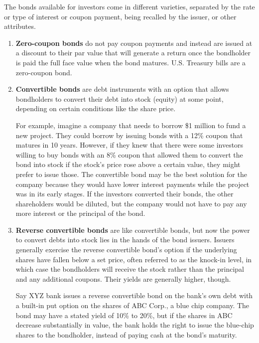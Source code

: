 \documentclass{article}
\begin{document}
    \begin{definition}
      The bonds available for investors come in different varieties, separated by the rate or type of interest or coupon payment, being recalled by the issuer, or other attributes. 
      \begin{enumerate}
        \item \textbf{Zero-coupon bonds} do not pay coupon payments and instead are issued at a discount to their par value that will generate a return once the bondholder is paid the full face value when the bond matures. U.S. Treasury bills are a zero-coupon bond. 
        \item \textbf{Convertible bonds} are debt instruments with an option that allows bondholders to convert their debt into stock (equity) at some point, depending on certain conditions like the share price. 
        
        For example, imagine a company that needs to borrow \$1 million to fund a new project. They could borrow by issuing bonds with a 12\% coupon that matures in 10 years. However, if they knew that there were some investors willing to buy bonds with an 8\% coupon that allowed them to convert the bond into stock if the stock’s price rose above a certain value, they might prefer to issue those. The convertible bond may be the best solution for the company because they would have lower interest payments while the project was in its early stages. If the investors converted their bonds, the other shareholders would be diluted, but the company would not have to pay any more interest or the principal of the bond. 
        
        \item \textbf{Reverse convertible bonds} are like convertible bonds, but now the power to convert debts into stock lies in the hands of the bond issuers. Issuers generally exercise the reverse convertible bond's option if the underlying shares have fallen below a set price, often referred to as the knock-in level, in which case the bondholders will receive the stock rather than the principal and any additional coupons. Their yields are generally higher, though. 
        
        Say XYZ bank issues a reverse convertible bond on the bank's own debt with a built-in put option on the shares of ABC Corp., a blue chip company. The bond may have a stated yield of 10\% to 20\%, but if the shares in ABC decrease substantially in value, the bank holds the right to issue the blue-chip shares to the bondholder, instead of paying cash at the bond's maturity.
        

\end{enumerate}
\end{definition}
\end{document}
